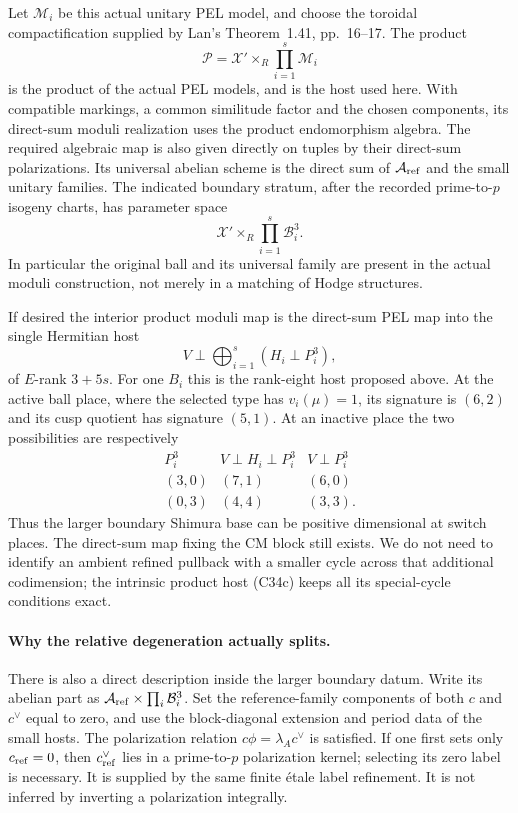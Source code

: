 Let $\mathscr M_i$ be this actual unitary
PEL model, and choose the toroidal
compactification supplied by Lan's
Theorem~1.41, pp.~16--17. The product
\[
             \mathscr P=\mathcal X'\times_R
                             \prod_{i=1}^{s}\mathscr M_i
                                                        \tag{C34c}
\]
is the product of the actual PEL
models, and is the host used here.
With compatible markings, a common
similitude factor and the chosen
components, its direct-sum moduli
realization uses the product
endomorphism algebra. The required
algebraic map is also given directly
on tuples by their direct-sum
polarizations. Its universal
abelian scheme is the direct sum of
$\mathcal A_{\rm ref}$ and the small
unitary families. The indicated boundary
stratum, after the recorded prime-to-$p$
isogeny charts, has parameter space
\[
             \mathcal X'\times_R
                             \prod_{i=1}^{s}\mathcal B_i^3.
                                                        \tag{C34d}
\]
In particular the original ball and its
universal family are present in the
actual moduli construction, not merely
in a matching of Hodge structures.

If desired the interior product moduli
map is the direct-sum PEL map into the
single Hermitian host
\[
             V\perp\bigoplus_{i=1}^{s}(H_i\perp P_i^3),
                                                        \tag{C34e}
\]
of $E$-rank $3+5s$. For one $B_i$ this
is the rank-eight host proposed above.
At the active ball place, where the
selected type has $v_i(\mu)=1$, its
signature is $(6,2)$ and its cusp
quotient has signature $(5,1)$. At an
inactive place the two possibilities
are respectively
\[
 \begin{array}{c|c|c}
 P_i^3&V\perp H_i\perp P_i^3&V\perp P_i^3\\ \hline
 (3,0)&(7,1)&(6,0)\\
 (0,3)&(4,4)&(3,3).
 \end{array}                                           \tag{C34f}
\]
Thus the larger boundary Shimura base
can be positive dimensional at switch
places. The direct-sum map fixing the
CM block still exists. We do not need
to identify an ambient refined pullback
with a smaller cycle across that
additional codimension; the intrinsic
product host (C34c) keeps all its
special-cycle conditions exact.

\paragraph{Why the relative degeneration actually splits.}
There is also a direct description inside
the larger boundary datum. Write its
abelian part as
$\mathcal A_{\rm ref}\times\prod_i\mathcal B_i^3$.
Set the reference-family components of
both $c$ and $c^\vee$ equal to zero,
and use the block-diagonal extension
and period data of the small hosts.
The polarization relation
$c\phi=\lambda_Ac^\vee$ is satisfied.
If one first sets only $c_{\rm ref}=0$,
then $c^\vee_{\rm ref}$ lies in a
prime-to-$p$ polarization kernel;
selecting its zero label is necessary.
It is supplied by the same finite
\'etale label refinement. It is not
inferred by inverting a polarization
integrally.

